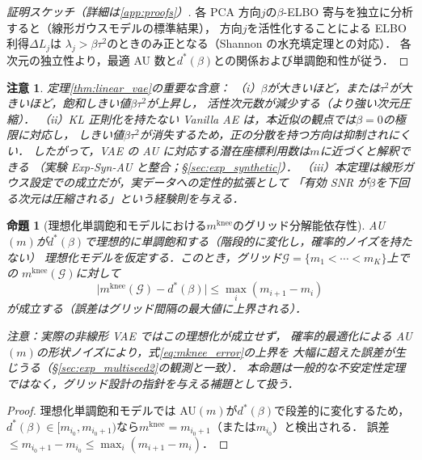 \documentclass[11pt,a4paper]{jsarticle}
\newtheorem{proposition}{命題}
\newtheorem{remark}{注意}
\newcommand{\mknee}{m^{\mathrm{knee}}}
\begin{document}
\begin{proof}[証明スケッチ（詳細は\ref{app:proofs}）]
各 PCA 方向$j$の$\beta$-ELBO 寄与を独立に分析すると（線形ガウスモデルの標準結果），
方向$j$を活性化することによる ELBO 利得$\Delta L_j$は
$\lambda_j > \beta\tau^2$のときのみ正となる（Shannon の水充填定理との対応）．
各次元の独立性より，最適 AU 数と$d^*(\beta)$との関係および単調飽和性が従う．
\end{proof}

\begin{remark}
定理\ref{thm:linear_vae}の重要な含意：
（i）$\beta$が大きいほど，または$\tau^2$が大きいほど，飽和しきい値$\beta\tau^2$が上昇し，
活性次元数が減少する（より強い次元圧縮）．
（ii）KL 正則化を持たない Vanilla AE は，本近似の観点では$\beta = 0$の極限に対応し，
しきい値$\beta\tau^2$が消失するため，正の分散を持つ方向は抑制されにくい．
したがって，VAE の AU に対応する潜在座標利用数は$m$に近づくと解釈できる
（実験 Exp-Syn-AU と整合；§\ref{sec:exp_synthetic}）．
（iii）本定理は線形ガウス設定での成立だが，実データへの定性的拡張として
「有効 SNR が$\beta$を下回る次元は圧縮される」という経験則を与える．
\end{remark}

\begin{proposition}[理想化単調飽和モデルにおける$\mknee$のグリッド分解能依存性]\label{thm:mknee_instab}
AU$(m)$が$d^*(\beta)$で理想的に単調飽和する（階段的に変化し，確率的ノイズを持たない）
理想化モデルを仮定する．このとき，グリッド$\mathcal{G} = \{m_1 < \cdots < m_K\}$上での
$\mknee(\mathcal{G})$に対して
\begin{equation}
  \bigl|\mknee(\mathcal{G}) - d^*(\beta)\bigr|
  \leq \max_{i} (m_{i+1} - m_i)
  \label{eq:mknee_error}
\end{equation}
が成立する（誤差はグリッド間隔の最大値に上界される）．

\noindent\textit{注意：実際の非線形 VAE ではこの理想化が成立せず，
確率的最適化による AU$(m)$の形状ノイズにより，式\eqref{eq:mknee_error}の上界を
大幅に超えた誤差が生じうる（§\ref{sec:exp_multiseed2}の観測と一致）．
本命題は一般的な不安定性定理ではなく，グリッド設計の指針を与える補題として扱う．}
\end{proposition}

\begin{proof}
理想化単調飽和モデルでは AU$(m)$が$d^*(\beta)$で段差的に変化するため，
$d^*(\beta) \in [m_{i_0}, m_{i_0+1})$なら$\mknee = m_{i_0+1}$（または$m_{i_0}$）と検出される．
誤差$\leq m_{i_0+1} - m_{i_0} \leq \max_i(m_{i+1}-m_i)$．
\end{proof}
\end{document}
